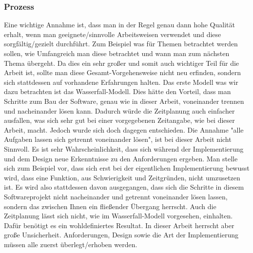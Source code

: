\subsubsection{Prozess}
Eine wichtige Annahme ist, dass man in der Regel genau dann hohe Qualität erhalt, wenn man geeignete/sinnvolle Arbeitsweisen verwendet und diese sorgfältig/gezielt durchführt. Zum Beispiel was für Themen betrachtet werden sollen, wie Umfangreich man diese betrachtet und wann man zum nächsten Thema übergeht.
Da dies ein sehr großer und somit auch wichtiger Teil für die Arbeit ist, sollte man diese Gesamt-Vorgehensweise nicht neu erfinden, sondern sich stattdessen auf vorhandene Erfahrungen halten.
Das erste Modell was wir dazu betrachten ist das Wasserfall-Modell. Dies hätte den Vorteil, dass man Schritte zum Bau der Software, genau wie in dieser Arbeit, voneinander trennen und nacheinander lösen kann. Dadurch würde die Zeitplanung auch einfacher ausfallen, was sich sehr gut bei einer vorgegebenen Zeitangabe, wie bei dieser Arbeit, macht.
Jedoch wurde sich doch dagegen entschieden. Die Annahme "alle Aufgaben lassen sich getrennt voneinander lösen", ist bei dieser Arbeit nicht Sinnvoll. Es ist sehr Wahrscheinlichkeit, dass sich während der Implementierung und dem Design neue Erkenntnisse zu den Anforderungen ergeben. Man stelle sich zum Beispiel vor, dass sich erst bei der eigentlichen Implementierung bewusst wird, dass eine Funktion, aus Schwierigkeit und Zeitgründen, nicht umzusetzen ist. Es wird also stattdessen davon ausgegangen, dass sich die Schritte in diesem Softwareprojekt nicht nacheinander und getrennt voneinander lösen lassen, sondern das zwischen Ihnen ein fließender Übergang herrscht.
Auch die Zeitplanung lässt sich nicht, wie im Wasserfall-Modell vorgesehen, einhalten. Dafür benötigt es ein wohldefiniertes Resultat. In dieser Arbeit herrscht aber große Unsicherheit. Anforderungen, Design sowie die Art der Implementierung müssen alle zuerst überlegt/erhoben werden.


